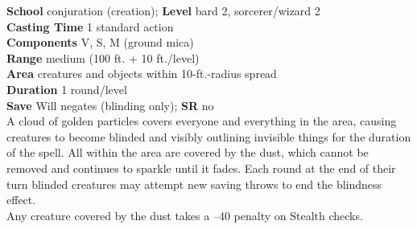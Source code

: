 \textbf{School }conjuration (creation); \textbf{Level }bard 2, sorcerer/wizard 2\\
\textbf{Casting Time }1 standard action\\
\textbf{Components }V, S, M (ground mica)\\
\textbf{Range }medium (100 ft. + 10 ft./level)\\
\textbf{Area }creatures and objects within 10-ft.-radius spread\\
\textbf{Duration }1 round/level\\
\textbf{Save }Will negates (blinding only); \textbf{SR }no\\
A cloud of golden particles covers everyone and everything in the area, causing creatures to become blinded and visibly outlining invisible things for the duration of the spell. All within the area are covered by the dust, which cannot be removed and continues to sparkle until it fades. Each round at the end of their turn blinded creatures may attempt new saving throws to end the blindness effect.\\
Any creature covered by the dust takes a –40 penalty on Stealth checks.\\
